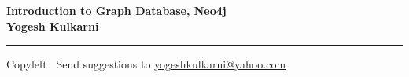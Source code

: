 
\graphicspath{{images/}}

\footnotesize


\begin{center}
\Large{\textbf{Introduction to Graph Database, Neo4j\\ Yogesh Kulkarni}}  
\end{center}

\begin{multicols}{2}

\end{multicols}

\rule{\linewidth}{0.25pt}
\scriptsize
Copyleft \textcopyleft\  Send suggestions to 
\href{http://www.yogeshkulkarni.com}{yogeshkulkarni@yahoo.com}


